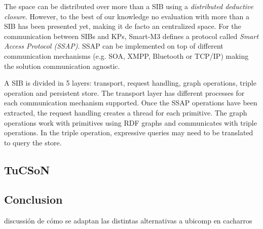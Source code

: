 The space can be distributed over more than a SIB using a \emph{distributed deductive closure}. %
However, to the best of our knowledge no evaluation with more than a SIB has been presented yet, making it de facto an centralized space.
For the communication between SIBs and KPs, Smart-M3 defines a protocol called \emph{Smart Access Protocol (SSAP)}.
SSAP can be implemented on top of different communication mechanisms (e.g. SOA, XMPP, Bluetooth or TCP/IP) making the solution communication agnostic. %


A SIB is divided in 5 layers: transport, request handling, graph operations, triple operation and persistent store.
The transport layer has different processes for each communication mechanism supported.
Once the SSAP operations have been extracted, the request handling creates a thread for each primitive.
The graph operations work with primitives using RDF graphs and communicates with triple operations.
In the triple operation, expressive queries may need to be translated to query the store.



\subsection{TuCSoN}






\subsection{Conclusion} %




discussión de cómo se adaptan las distintas alternativas a ubicomp en cacharros




